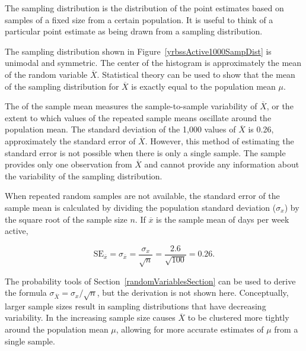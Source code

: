 \begin{spacing}{1.5}
\begin{termBox}{
The sampling distribution is the distribution of the point estimates based on samples of a fixed size from a certain population. It is useful to think of a particular point estimate as being drawn from a sampling distribution.}
\end{termBox}

The sampling distribution shown in Figure~\ref{yrbssActive1000SampDist} is unimodal and symmetric. The center of the histogram is approximately the mean of the random variable $\overline{X}$. Statistical theory can be used to show that the mean of the sampling distribution for $\overline{X}$ is exactly equal to the population mean $\mu$. 

The  of the sample mean measures the sample-to-sample variability of $\overline{X}$, or the extent to which values of the repeated sample means oscillate around the population mean. The standard deviation of the 1,000 values of $\overline{X}$ is 0.26, approximately the standard error of $\overline{X}$. However, this method of estimating the standard error is not possible when there is only a single sample. The sample provides only one observation from $\overline{X}$ and cannot provide any information about the variability of the sampling distribution.

When repeated random samples are not available, the standard error of the sample mean is calculated by dividing the population standard deviation ($\sigma_{x}$) by the square root of the sample size $n$. If $\overline{x}$ is the sample mean of days per week active,

\[\text{SE}_{\overline{x}} = \sigma_{\overline{x}} = \dfrac{\sigma_{x}}{\sqrt{n}} = \dfrac{2.6}{\sqrt{100}} = 0.26.\]

The probability tools of Section~\ref{randomVariablesSection} can be used to derive the formula $\sigma_{\overline{X}} = \sigma_x/\sqrt{n}$, but the derivation is not shown here. Conceptually, larger sample sizes result in sampling distributions that have decreasing variability. In the increasing sample size causes $\overline{X}$ to be clustered more tightly around the population mean $\mu$, allowing for more accurate estimates of $\mu$ from a single sample.




\end{spacing}
